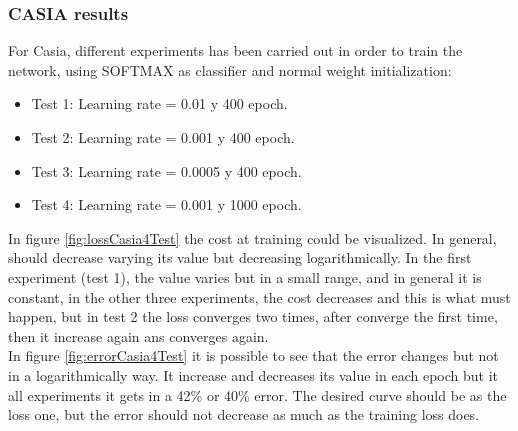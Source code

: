 \subsubsection{CASIA results}
For Casia, different experiments has been carried out in order to train the network, using SOFTMAX as classifier and normal weight initialization:\\

\begin{itemize}
\item{Test 1}: Learning rate = 0.01 y 400 epoch.
\item{Test 2}: Learning rate = 0.001 y 400 epoch.
\item{Test 3}: Learning rate = 0.0005 y 400 epoch.
\item{Test 4}: Learning rate = 0.001 y 1000 epoch.
\end{itemize}


In figure \ref{fig:lossCasia4Test} the cost at training could be visualized. In general, should decrease varying its value but decreasing logarithmically. In the first experiment (test 1), the value varies but in a small range, and in general it is constant, in the other three experiments, the cost decreases and this is what must happen, but in test 2 the loss converges two times, after converge the first time, then it increase again ans converges again.\\

In figure \ref{fig:errorCasia4Test} it is possible to see that the error changes but not in a logarithmically way. It increase and decreases its value in each epoch but it all experiments it gets in a 42\% or 40\% error. The desired curve should be as the loss one, but the error should not decrease as much as the training loss does.\\


